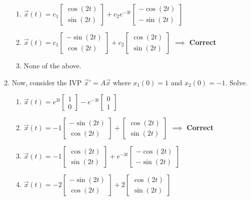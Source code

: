 \documentclass[11pt]{article}
\begin{document}
\begin{enumerate}
\begin{enumerate}
		\item $\vec{x}(t) = c_1\begin{bmatrix}\cos(2t)\\\sin(2t)\end{bmatrix} + c_2e^{-3t}\begin{bmatrix}-\cos(2t)\\-\sin(2t)\end{bmatrix}$
		\item $\vec{x}(t) = c_1\begin{bmatrix}-\sin(2t)\\\cos(2t)\end{bmatrix} + c_2\begin{bmatrix}\cos(2t)\\\sin(2t)\end{bmatrix}$ $\implies$ \textbf{Correct}
		\item None of the above. 
	\end{enumerate}
\newpage
	\item Now, consider the IVP $\vec{x}' = A\vec{x}$ where $x_1(0) = 1$ and $x_2(0) = -1$. Solve. 
	\begin{enumerate}
		\item $\vec{x}(t) = e^{3t}\begin{bmatrix}1\\0 \end{bmatrix} -e^{-3t}\begin{bmatrix}0\\1 \end{bmatrix}$
		\item $\vec{x}(t) = -1\begin{bmatrix}-\sin(2t)\\\cos(2t)\end{bmatrix} + \begin{bmatrix}\cos(2t)\\\sin(2t)\end{bmatrix}$  $\implies$ \textbf{Correct}
		\item $\vec{x}(t) = -1\begin{bmatrix}\cos(2t)\\\sin(2t)\end{bmatrix} + e^{-3t}\begin{bmatrix}-\cos(2t)\\-\sin(2t)\end{bmatrix}$
		\item $\vec{x}(t) = -2\begin{bmatrix}-\sin(2t)\\\cos(2t)\end{bmatrix} + 2\begin{bmatrix}\cos(2t)\\\sin(2t)\end{bmatrix}$ 

\end{enumerate}
\end{enumerate}
\end{document}
